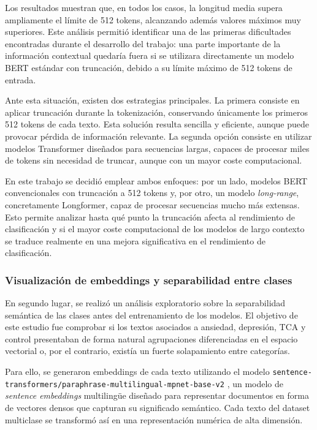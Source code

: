 Los resultados muestran que, en todos los casos, la longitud media supera ampliamente el límite de 512 tokens, alcanzando además valores máximos muy superiores. Este análisis permitió identificar una de las primeras dificultades encontradas durante el desarrollo del trabajo: una parte importante de la información contextual quedaría fuera si se utilizara directamente un modelo \ac{BERT} estándar con truncación, debido a su límite máximo de 512 tokens de entrada.

Ante esta situación, existen dos estrategias principales. La primera consiste en aplicar truncación durante la tokenización, conservando únicamente los primeros 512 tokens de cada texto. Esta solución resulta sencilla y eficiente, aunque puede provocar pérdida de información relevante. La segunda opción consiste en utilizar modelos Transformer diseñados para secuencias largas, capaces de procesar miles de tokens sin necesidad de truncar, aunque con un mayor coste computacional.

En este trabajo se decidió emplear ambos enfoques: por un lado, modelos \ac{BERT} convencionales con truncación a 512 tokens y, por otro, un modelo \textit{long-range}, concretamente Longformer, capaz de procesar secuencias mucho más extensas. Esto permite analizar hasta qué punto la truncación afecta al rendimiento de clasificación y si el mayor coste computacional de los modelos de largo contexto se traduce realmente en una mejora significativa en el rendimiento de clasificación.

\subsubsection{Visualización de embeddings y separabilidad entre clases}

En segundo lugar, se realizó un análisis exploratorio sobre la separabilidad semántica de las clases antes del entrenamiento de los modelos. El objetivo de este estudio fue comprobar si los textos asociados a ansiedad, depresión, \ac{TCA} y control presentaban de forma natural agrupaciones diferenciadas en el espacio vectorial o, por el contrario, existía un fuerte solapamiento entre categorías.

Para ello, se generaron embeddings de cada texto utilizando el modelo \texttt{sentence-transformers/paraphrase-multilingual-mpnet-base-v2} \cite{reimers_making_2020}, un modelo de \textit{sentence embeddings} multilingüe diseñado para representar documentos en forma de vectores densos que capturan su significado semántico. Cada texto del dataset multiclase se transformó así en una representación numérica de alta dimensión.

